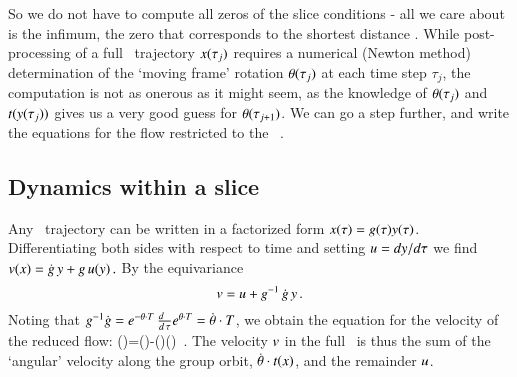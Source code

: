 So we do not have to compute all zeros of the slice conditions
 - all we care about is the infimum, the zero that
corresponds to the shortest distance .
While post-processing of a full \statesp\ trajectory $x(\tau_j)$
requires a numerical (Newton method) determination of the
`moving frame' rotation
${\bf \theta}(\tau_j)$ at each time step $\tau_j$, the computation is not
as onerous as it might seem, as the knowledge of ${\bf \theta}(\tau_j)$ and
$t(y(\tau_j))$
gives us a very good guess for ${\bf \theta}(\tau_{j+1})$. We
can go a step further, and write the equations for the flow restricted to
the \reducedsp\ \pSRed.

\subsection{Dynamics within a slice}
\label{sec:mslices}

Any \statesp\ trajectory can be written in a factorized
form $x(\tau)=g(\tau)
y(\tau)$. Differentiating both sides with respect to time and
setting $u={dy}/{d\tau}$ we find
\(
v(x)=\dot{g} \, y+g \, u(y)
\,.
\)
By the equivariance 
\[
v=u + g^{-1} \, \dot{g} \, y
\,.
\]
Noting that $g^{-1}\dot{g}=e^{-{\bf \theta} \cdot T} \,
\frac{d ~~}{d \, \tau} e^{{\bf \theta} \cdot T}=\dot{{\bf \theta}}\cdot T$,
we obtain the equation for the velocity of the reduced flow:
\beq
\velRed(\sspRed)=\vel(\sspRed)-\dot{\gSpace}(\sspRed)\cdot \groupTan(\sspRed)
\,.
The velocity $v$ in the full \statesp\ is thus the sum of the
`angular' velocity  along the group orbit,
$\dot{{\bf \theta}} \cdot t(x)$, and the remainder $u$.


